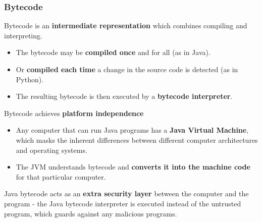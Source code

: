 \subsubsection*{Bytecode}

Bytecode is an \textbf{intermediate representation} which combines compiling and interpreting.
\begin{itemize}
    \item The bytecode may be \textbf{compiled once} and for all (as in Java).
    \item Or \textbf{compiled each time} a change in the source code is detected (as in Python).
    \item The resulting bytecode is then executed by a \textbf{bytecode interpreter}.
\end{itemize}

Bytecode achieves \textbf{platform independence}
\begin{itemize}
    \item Any computer that can run Java programs has a \textbf{Java Virtual Machine}, which masks the inherent differences between different computer architectures and operating systems.
    \item The JVM understands bytecode and \textbf{converts it into the machine code} for that particular computer.
\end{itemize}

Java bytecode acts as an \textbf{extra security layer} between the computer and the program - the Java bytecode interpreter is executed instead of the untrusted program, which guards against any malicious programs.

